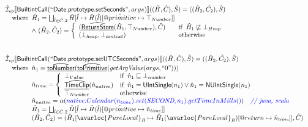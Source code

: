 \[
\begin{array}{l}

\aI _{cp}\lbr \SF{BuiltintCall}(``\SF{Date.prototype.setSeconds}",args_{})\rbr((\hat{H},\hat{C}), \hat{S})
  = ((\hat{H}_2, \hat{C_2}), \hat{S})\\
\quad\wherec{
  \hat{H}_1 = \bigsqcup_{\hat{l} \in \hat{C}.2} \hat{H}[\hat{l}
    \mapsto \hat{H}(\hat{l})[\avarprop{primitive} \mapsto \top_{Number}]]\\
  \land\ (\hat{H}_2, \hat{C}_2) = 
    \left\{\begin{array}{l@{\quad\quad}l}
      (\ahf{ReturnStore}(\hat{H}_1, \top_{Number}), \hat{C})
      & \ifc{\hat{H}_1 \not\sqsubseteq \bot_{Heap}}\\
      (\bot_{heap}, \bot_{context}) & \owc \\
    \end{array}\right.\\
  }\\
\\\\

\aI _{cp}\lbr \SF{BuiltintCall}(``\SF{Date.prototype.setUTCSeconds}",args_{})\rbr((\hat{H},\hat{C}), \hat{S})
  = ((\hat{H}_2, \hat{C_2}), \hat{S})\\
\quad\wherec{
  \hat{n}_{1} = \ahf{toNumber}(\ahf{toPrimitive}(\hf{getArgValue}(args, ``0")))\\
  \hat{n}_{time} = \left\{\begin{array}{ll}
      \bot_{Value} & \ifc{\hat{n}_{1} \sqsubseteq  \bot_{number}}\\
      \ahf{TimeClip}(\hat{n}_{native})
      & \ifc{\hat{n}_{1} = \SF{UIntSingle}(n_{1}) \lor \hat{n}_{1} = \SF{NUIntSingle}(n_{1}) }\\
      \top_{Number} & \owc
    \end{array}\right.\\
  \hat{n}_{naitve} = \alpha({\inblue native.Calendar(n_{time}).set(\emph{SECOND}, n_{1}).getTimeInMills()})
    \quad\comment{{\inblue // java, scala}}\\  
  \hat{H}_1 = \bigsqcup_{\hat{l} \in \hat{C}.2} \hat{H}[\hat{l}
    \mapsto \hat{H}(\hat{l})[\avarprop{primitive} \mapsto \hat{n}_{time}]]\\
  (\hat{H}_2, \hat{C}_2) = 
    (\hat{H}_1[\avarloc{PureLocal}_R \mapsto \hat{H}_1(\avarloc{PureLocal}_R)
      [\varprop{return} \mapsto \hat{n}_{time}]], \hat{C})\\
  }\\
\\\\



\end{array}\]

